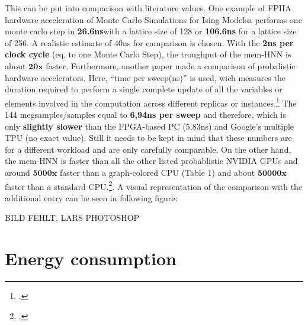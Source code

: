 This can be put into comparison with literature values. One example of FPHA hardware acceleration of Monte Carlo Simulations for Ising Modelsa
performs one monte carlo step in \textbf{26.6ns}with a lattice size of 128 or \textbf{106.6ns} for a lattice size of 256.
A realistic estimate of 40ns for camparison is chosen. With the \textbf{2ns per clock cycle} (eq. to one Monte Carlo Step),
the troughput of the \ac{mem-HNN} is about \(\mathbf{20x}\) faster.
Furthermore, another paper made a comparison of probalistic hardware accelerators. Here, ``time per sweep(ns)'' is used, wich measures the duration required to perform a single complete update of all the variables or elements involved in the computation across different replicas or instances.\footcite[cf.][2]{aaditAcceleratingAdaptiveParallel2023}
The 144 megsamples/samples equal to \textbf{6,94ns per sweep} and therefore, which is only \textbf{slightly slower} than the FPGA-based PC (5.83ns) and Google’s
multiple TPU (no exact value). Still it needs to be kept in mind that these numbers are for a different workload and are only carefully comparable. 
On the other hand, the \ac{mem-HNN} is faster than all the other listed probablistic NVIDIA \ac{GPU}s and around \(\mathbf{5000x}\) faster than a graph-colored \ac{CPU} (Table 1) and about \(\mathbf{50000x}\) faster than a standard \ac{CPU}.\footcite[cf.][2]{aaditAcceleratingAdaptiveParallel2023}.
A visual representation of the comparison with the additional entry can be seen in following figure:

BILD FEHLT, LARS PHOTOSHOP

\section{Energy consumption}

